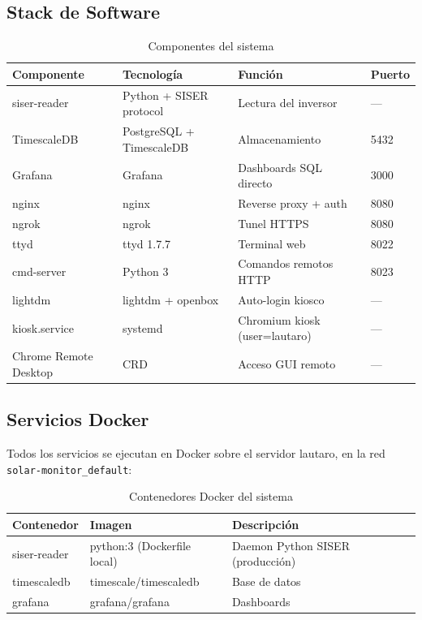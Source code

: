 \documentclass[12pt,a4paper]{article}
\begin{document}
\subsection{Stack de Software}

\begin{table}[H]
\centering
\begin{tabular}{llll}
\toprule
\textbf{Componente} & \textbf{Tecnolog\'ia} & \textbf{Funci\'on} & \textbf{Puerto} \\
\midrule
siser-reader & Python + SISER protocol & Lectura del inversor & --- \\
TimescaleDB & PostgreSQL + TimescaleDB & Almacenamiento & 5432 \\
Grafana & Grafana & Dashboards SQL directo & 3000 \\
nginx & nginx & Reverse proxy + auth & 8080 \\
ngrok & ngrok & Tunel HTTPS & 8080 \\
ttyd & ttyd 1.7.7 & Terminal web & 8022 \\
cmd-server & Python 3 & Comandos remotos HTTP & 8023 \\
lightdm & lightdm + openbox & Auto-login kiosco & --- \\
kiosk.service & systemd & Chromium kiosk (user=lautaro) & --- \\
Chrome Remote Desktop & CRD & Acceso GUI remoto & --- \\
\bottomrule
\end{tabular}
\caption{Componentes del sistema}
\end{table}

\subsection{Servicios Docker}

Todos los servicios se ejecutan en Docker sobre el servidor lautaro, en la red \texttt{solar-monitor\_default}:

\begin{table}[H]
\centering
\begin{tabular}{lll}
\toprule
\textbf{Contenedor} & \textbf{Imagen} & \textbf{Descripci\'on} \\
\midrule
siser-reader & python:3 (Dockerfile local) & Daemon Python SISER (producci\'on) \\
timescaledb & timescale/timescaledb & Base de datos \\
grafana & grafana/grafana & Dashboards \\
\bottomrule
\end{tabular}
\caption{Contenedores Docker del sistema}
\end{table}
\end{document}
